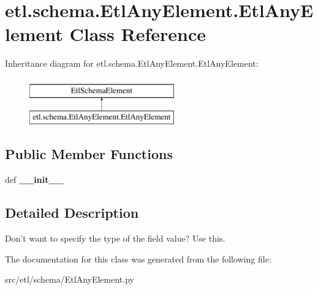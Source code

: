 \hypertarget{classetl_1_1schema_1_1EtlAnyElement_1_1EtlAnyElement}{\section{etl.\-schema.\-Etl\-Any\-Element.\-Etl\-Any\-Element Class Reference}
\label{classetl_1_1schema_1_1EtlAnyElement_1_1EtlAnyElement}
}
Inheritance diagram for etl.\-schema.\-Etl\-Any\-Element.\-Etl\-Any\-Element\-:\begin{figure}[H]
\begin{center}
\leavevmode
\includegraphics[height=2.000000cm]{classetl_1_1schema_1_1EtlAnyElement_1_1EtlAnyElement}
\end{center}
\end{figure}
\subsection*{Public Member Functions}
\begin{DoxyCompactItemize}
\item 
\hypertarget{classetl_1_1schema_1_1EtlAnyElement_1_1EtlAnyElement_af041ac2088b464cd3bf09b3380f9a10f}{def {\bfseries \-\_\-\-\_\-init\-\_\-\-\_\-}}\label{classetl_1_1schema_1_1EtlAnyElement_1_1EtlAnyElement_af041ac2088b464cd3bf09b3380f9a10f}

\end{DoxyCompactItemize}


\subsection{Detailed Description}
\begin{DoxyVerb}Don't want to specify the type of the field value?  Use this.\end{DoxyVerb}
 

The documentation for this class was generated from the following file\-:\begin{DoxyCompactItemize}
\item 
src/etl/schema/Etl\-Any\-Element.\-py\end{DoxyCompactItemize}

